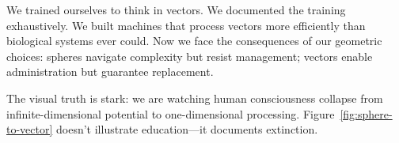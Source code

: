 We trained ourselves to think in vectors. We documented the training exhaustively. We built machines that process vectors more efficiently than biological systems ever could. Now we face the consequences of our geometric choices: spheres navigate complexity but resist management; vectors enable administration but guarantee replacement.

The visual truth is stark: we are watching human consciousness collapse from infinite-dimensional potential to one-dimensional processing. Figure~\ref{fig:sphere-to-vector} doesn't illustrate education---it documents extinction.